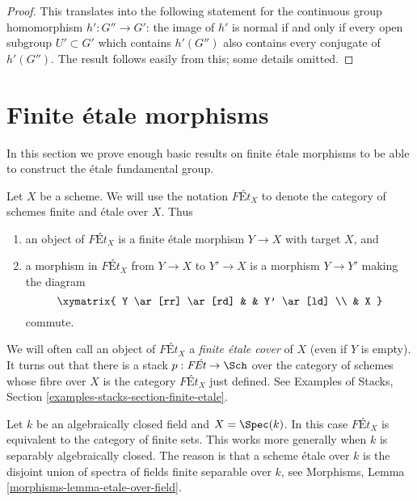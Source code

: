 \begin{proof}
This translates into the following statement for the continuous
group homomorphism $h' : G'' \to G'$: the image of $h'$ is normal
if and only if every open subgroup $U' \subset G'$ which
contains $h'(G'')$ also contains every conjugate of $h'(G'')$.
The result follows easily from this; some details omitted.
\end{proof}






\section{Finite \'etale morphisms}
\label{section-finite-etale}

\noindent
In this section we prove enough basic results on finite \'etale
morphisms to be able to construct the \'etale fundamental group.

\medskip\noindent
Let $X$ be a scheme. We will use the notation $\textit{F\'Et}_X$
to denote the category of schemes finite and \'etale over $X$.
Thus
\begin{enumerate}
\item an object of $\textit{F\'Et}_X$ is a finite \'etale morphism
$Y \to X$ with target $X$, and
\item a morphism in $\textit{F\'Et}_X$
from $Y \to X$ to $Y' \to X$ is a morphism $Y \to Y'$ making
the diagram
$$
\xymatrix{
Y \ar[rr] \ar[rd] & &  Y' \ar[ld] \\
& X
}
$$
commute.
\end{enumerate}
We will often call an object of $\textit{F\'Et}_X$ a
{\it finite \'etale cover} of $X$ (even if $Y$ is empty).
It turns out that there is a stack $p : \textit{F\'Et} \to \Sch$
over the category of schemes whose fibre over $X$ is the category
$\textit{F\'Et}_X$ just defined. See Examples of Stacks, Section
\ref{examples-stacks-section-finite-etale}.

\begin{example}
\label{example-finite-etale-geometric-point}
Let $k$ be an algebraically closed field and $X = \Spec(k)$. In this case
$\textit{F\'Et}_X$ is equivalent to the category of finite sets. This works
more generally when $k$ is separably algebraically closed. The reason is
that a scheme \'etale over $k$ is the disjoint union of spectra of
fields finite separable over $k$, see
Morphisms, Lemma \ref{morphisms-lemma-etale-over-field}.
\end{example}


